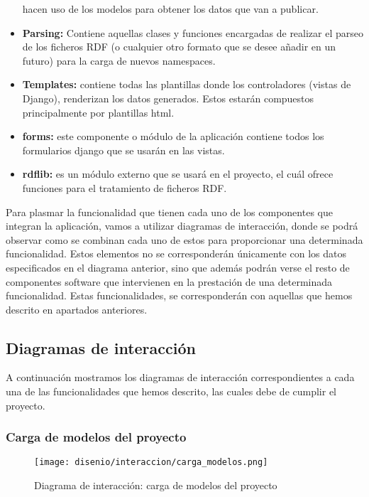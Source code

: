 \begin{itemize}
        hacen uso de los modelos para obtener los datos que van a publicar.
    \item \textbf{Parsing:} Contiene aquellas clases y funciones encargadas de
        realizar el parseo de los ficheros RDF (o cualquier otro formato que se
        desee añadir en un futuro) para la carga de nuevos namespaces.
    \item \textbf{Templates:} contiene todas las plantillas donde los
        controladores (vistas de Django), renderizan los datos generados. Estos
        estarán compuestos principalmente por plantillas html.
    \item \textbf{forms:} este componente o módulo de la aplicación contiene
        todos los formularios django que se usarán en las vistas.
    \item \textbf{rdflib:} es un módulo externo que se usará en el proyecto, el
        cuál ofrece funciones para el tratamiento de ficheros RDF.
\end{itemize}

Para plasmar la funcionalidad que tienen cada uno de los componentes que
integran la aplicación, vamos a utilizar diagramas de interacción, donde se
podrá observar como se combinan cada uno de estos para proporcionar una
determinada funcionalidad. Estos elementos no se corresponderán únicamente con
los datos especificados en el diagrama anterior, sino que además podrán verse el
resto de componentes software que intervienen en la prestación de una
determinada funcionalidad. Estas funcionalidades, se corresponderán con aquellas
que hemos descrito en apartados anteriores.

\subsection{Diagramas de interacción}

A continuación mostramos los diagramas de interacción correspondientes a cada
una de las funcionalidades que hemos descrito, las cuales debe de cumplir el
proyecto.
\newpage
\subsubsection{Carga de modelos del proyecto}

\begin{figure}[H]
    \begin{center}
        \texttt{[image: disenio/interaccion/carga\_modelos.png]}
    \end{center}
    \caption{Diagrama de interacción: carga de modelos del proyecto}
    \label{fig:carga_modelos}
\end{figure}


